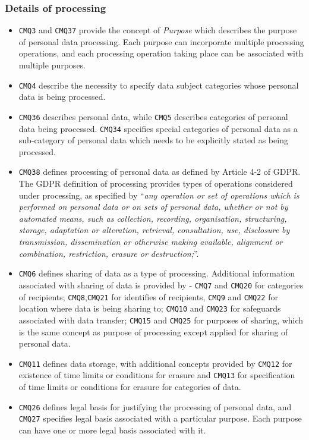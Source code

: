 \subsubsection{Details of processing}
\begin{itemize}
    \item \texttt{CMQ3} and \texttt{CMQ37} provide the concept of \textit{Purpose} which describes the purpose of personal data processing. Each purpose can incorporate multiple processing operations, and each processing operation taking place can be associated with multiple purposes.
    \item \texttt{CMQ4} describe the necessity to specify data subject categories whose personal data is being processed.
    \item \texttt{CMQ36} describes personal data, while \texttt{CMQ5} describes categories of personal data being processed. \texttt{CMQ34} specifies special categories of personal data as a sub-category of personal data which needs to be explicitly stated as being processed.
    \item \texttt{CMQ38} defines processing of personal data as defined by Article 4-2 of GDPR. The GDPR definition of processing provides types of operations considered under processing, as specified by ``\textit{any operation or set of operations which is performed on personal data or on sets of personal data, whether or not by automated means, such as collection, recording, organisation, structuring, storage, adaptation or alteration, retrieval, consultation, use, disclosure by transmission, dissemination or otherwise making available, alignment or combination, restriction, erasure or destruction;}''.
    \item \texttt{CMQ6} defines sharing of data as a type of processing. Additional information associated with sharing of data is provided by - \texttt{CMQ7} and \texttt{CMQ20} for categories of recipients; \texttt{CMQ8},\texttt{CMQ21} for identifies of recipients, \texttt{CMQ9} and \texttt{CMQ22} for location where data is being sharing to; \texttt{CMQ10} and \texttt{CMQ23} for safeguards associated with data transfer; \texttt{CMQ15} and \texttt{CMQ25} for purposes of sharing, which is the same concept as purpose of processing except applied for sharing of personal data.
    \item \texttt{CMQ11} defines data storage, with additional concepts provided by \texttt{CMQ12} for existence of time limits or conditions for erasure and \texttt{CMQ13} for specification of time limits or conditions for erasure for categories of data.
    \item \texttt{CMQ26} defines legal basis for justifying the processing of personal data, and \texttt{CMQ27} specifies legal basis associated with a particular purpose. Each purpose can have one or more legal basis associated with it.
\end{itemize}

